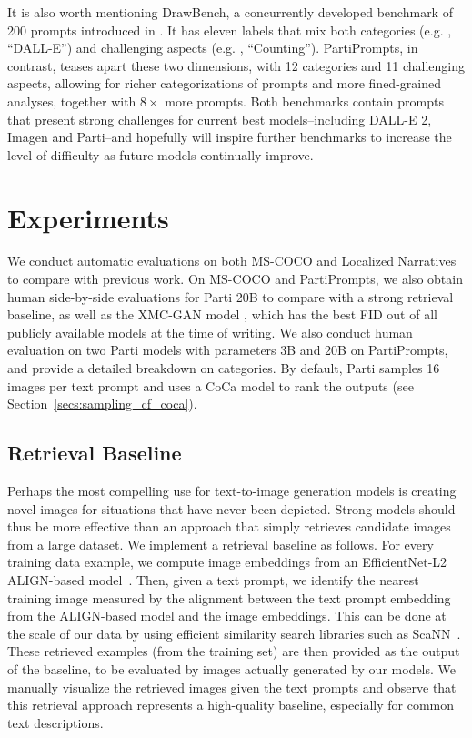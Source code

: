 It is also worth mentioning DrawBench, a concurrently developed benchmark of 200 prompts introduced in \cite{imagen}. It has eleven labels that mix both categories (e.g. , ``DALL-E'') and challenging aspects (e.g. , ``Counting''). PartiPrompts, in contrast, teases apart these two dimensions, with 12 categories and 11 challenging aspects, allowing for richer categorizations of prompts and more fined-grained analyses, together with \(8\times\) more prompts. Both benchmarks contain prompts that present strong challenges for current best models--including DALL-E 2, Imagen and Parti--and hopefully will inspire further benchmarks to increase the level of difficulty as future models continually improve.

\section{Experiments}

We conduct automatic evaluations on both MS-COCO and Localized Narratives to compare with previous work. On MS-COCO and PartiPrompts, we also obtain human side-by-side evaluations for Parti 20B to compare with a strong retrieval baseline, as well as the XMC-GAN model \cite{zhang2021cross}, which has the best FID out of all publicly available models at the time of writing. We also conduct human evaluation on two Parti models with parameters 3B and 20B on PartiPrompts, and provide a detailed breakdown on categories. By default, Parti samples 16 images per text prompt and uses a CoCa model to rank the outputs (see Section~\ref{secs:sampling_cf_coca}).

\subsection{Retrieval Baseline}  \label{secs:retrieval_model}
Perhaps the most compelling use for text-to-image generation models is creating novel images for situations that have never been depicted. Strong models should thus be more effective than an approach that simply retrieves candidate images from a large dataset. We implement a retrieval baseline as follows. For every training data example, we compute image embeddings from an EfficientNet-L2 ALIGN-based model~\cite{jia2021scaling}. Then, given a text prompt, we identify the nearest training image measured by the alignment between the text prompt embedding from the ALIGN-based model and the image embeddings. This can be done at the scale of our data by using efficient similarity search libraries such as ScaNN~\cite{avq_2020}. These retrieved examples (from the training set) are then provided as the output of the baseline, to be evaluated by images actually generated by our models. We manually visualize the retrieved images given the text prompts and observe that this retrieval approach represents a high-quality baseline, especially for common text descriptions.

